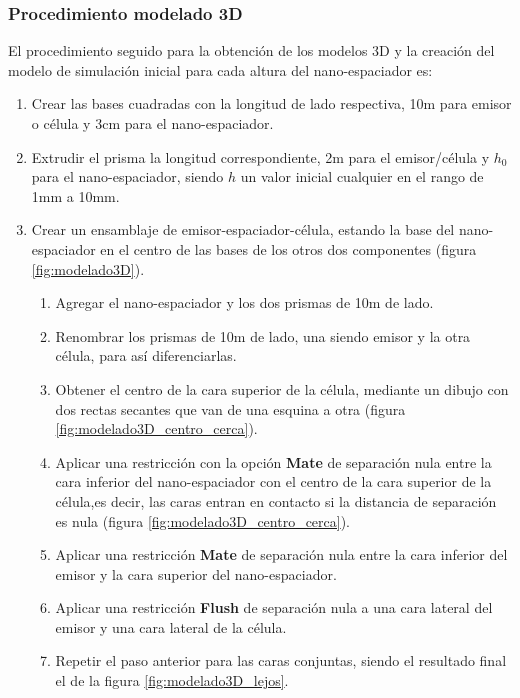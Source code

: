 \subsubsection{Procedimiento modelado 3D}
El procedimiento seguido para la obtención de los modelos 3D y la creación del modelo de simulación inicial para cada altura del nano-espaciador es:
\begin{enumerate}
	\item Crear las bases cuadradas con la longitud de lado respectiva, 10m para emisor o célula y 3cm para el nano-espaciador. 
	\item Extrudir el prisma la longitud correspondiente, 2m para el emisor/célula y $h_0$ para el nano-espaciador, siendo $h$ un valor inicial cualquier en el rango de 1mm a 10mm.
	\item Crear un ensamblaje de emisor-espaciador-célula, estando la base del nano-espaciador en el centro de las bases de los otros dos componentes (figura \ref{fig:modelado3D}).
	\begin{enumerate}
		\item Agregar el nano-espaciador y los dos prismas de 10m de lado.
		\item Renombrar los prismas de 10m de lado, una siendo emisor y la otra célula, para así diferenciarlas.
		\item Obtener el centro de la cara superior de la célula, mediante un dibujo con dos rectas secantes que van de una esquina a otra (figura \ref{fig:modelado3D_centro_cerca}).
		\item Aplicar una restricción con la opción \textbf{Mate} de separación nula entre la cara inferior del nano-espaciador con el centro de la cara superior de la célula,es decir, las caras entran en contacto si la distancia de separación es nula (figura \ref{fig:modelado3D_centro_cerca}).
		\item Aplicar una restricción \textbf{Mate} de separación nula entre la cara inferior del emisor y la cara superior del nano-espaciador.
		\item Aplicar una restricción \textbf{Flush} de separación nula a una cara lateral del emisor y una cara lateral de la célula.
		\item Repetir el paso anterior para las caras conjuntas, siendo el resultado final el de la figura \ref{fig:modelado3D_lejos}.
	\end{enumerate}
\begin{figure}[H]
	\centering
	\begin{subfigure}[b]{0.3\textwidth}

\end{subfigure}
\end{figure}
\end{enumerate}
